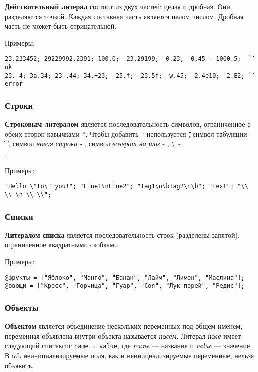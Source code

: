 {\bf Действительный литерал} состоит из двух частей: целая и дробная. Они разделяются точкой. Каждая составная часть является целом числом. Дробная часть не может быть отрицательной.

\noindent Примеры:
\begin{verbatim}
23.233452; 29229992.2391; 100.0; -23.29199; -0.23; -0.45 - 1000.5;  `` ok
23.-4; 3а.34; 23-.44; 34.+23; -25.f; -23.5f; -w.45; -2.4e10; -2.E2; `` error
\end{verbatim}

\subsubsection{Строки}

{\bf Строковым литералом} является последовательность символов, ограниченное с обеих сторон кавычками \texttt{"}. Чтобы добавить \texttt{"} используется \texttt{\"}, символ табуляции - \texttt{\t}, символ {\it новая строка} - \texttt{\n}, символ {\it возврат на шаг} - \texttt{\b}, \textbackslash \ - \texttt{\\}.

\noindent Примеры:
\begin{verbatim}
"Hello \"to\" you!"; "Line1\nLine2"; "Tag1\n\bTag2\n\b"; "text"; "\\ \\ \n \\ \\";
\end{verbatim}

\subsubsection{Списки}

{\bf Литералом списка} является последовательность строк (разделены запятой), ограниченное квадратными скобками.

\noindent Примеры:
\begin{verbatim}
@фрукты = ["Яблоко", "Манго", "Банан", "Лайм", "Лимон", "Маслина"];
@овощи = ["Кресс", "Горчица", "Гуар", "Соя", "Лук-порей", "Редис"];
\end{verbatim}

\subsubsection{Объекты}

{\bf Объектом} является объединение нескольких переменных под общем именем, переменная объявлена внутри объекта называется {\it полем}. Литерал {\it поле} имеет следующий синтаксис \texttt{name = value}, где  {\it name} — название и {\it value} — значение. В icL неинициализируемые поля, как и неинициализируемые переменные, нельзя объявить.

